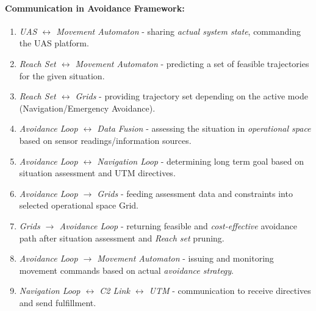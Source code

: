 
\paragraph{Communication in Avoidance Framework:}
\begin{enumerate}
    \item \emph{UAS $\leftrightarrow$ Movement Automaton} - sharing \emph{actual system state}, commanding the UAS platform.
    
    \item \emph{Reach Set $\leftrightarrow$ Movement Automaton} - predicting a set of feasible trajectories for the given situation.
    
    \item \emph{Reach Set $\leftrightarrow$ Grids} - providing trajectory set depending on the active mode (Navigation/Emergency Avoidance).
    
    \item \emph{Avoidance Loop $\leftrightarrow$ Data Fusion} - assessing the situation in \emph{operational space} based on sensor readings/information sources.
    
    \item \emph{Avoidance Loop $\leftrightarrow$ Navigation Loop} - determining long term goal based on situation assessment and UTM directives. 
    
    \item \emph{Avoidance Loop $\to$ Grids} - feeding assessment data and constraints into selected operational space Grid.
    
    \item \emph{Grids $\to$ Avoidance Loop} - returning feasible and \emph{cost-effective} avoidance path after situation assessment and \emph{Reach set} pruning.
    
    \item \emph{Avoidance Loop $\to$ Movement Automaton} - issuing and monitoring movement commands based on actual \emph{avoidance strategy}.
    
    \item \emph{Navigation Loop $\leftrightarrow$ C2 Link $\leftrightarrow$ UTM} - communication to receive directives and send fulfillment. 
\end{enumerate}